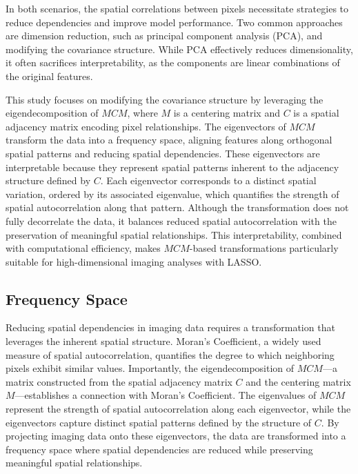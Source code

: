 \documentclass[12pt]{article}
\begin{document}
In both scenarios, the spatial correlations between pixels necessitate strategies to reduce dependencies and improve model performance. Two common approaches are dimension reduction, such as principal component analysis (PCA), and modifying the covariance structure. While PCA effectively reduces dimensionality, it often sacrifices interpretability, as the components are linear combinations of the original features.

This study focuses on modifying the covariance structure by leveraging the eigendecomposition of \( MCM \), where \( M \) is a centering matrix and \( C \) is a spatial adjacency matrix encoding pixel relationships. The eigenvectors of \( MCM \) transform the data into a frequency space, aligning features along orthogonal spatial patterns and reducing spatial dependencies. These eigenvectors are interpretable because they represent spatial patterns inherent to the adjacency structure defined by \( C \). Each eigenvector corresponds to a distinct spatial variation, ordered by its associated eigenvalue, which quantifies the strength of spatial autocorrelation along that pattern. Although the transformation does not fully decorrelate the data, it balances reduced spatial autocorrelation with the preservation of meaningful spatial relationships. This interpretability, combined with computational efficiency, makes \( MCM \)-based transformations particularly suitable for high-dimensional imaging analyses with LASSO.



\subsection{Frequency Space}

Reducing spatial dependencies in imaging data requires a transformation that leverages the inherent spatial structure. Moran's Coefficient, a widely used measure of spatial autocorrelation, quantifies the degree to which neighboring pixels exhibit similar values. Importantly, the eigendecomposition of \( MCM \)—a matrix constructed from the spatial adjacency matrix \( C \) and the centering matrix \( M \)—establishes a connection with Moran's Coefficient. The eigenvalues of \( MCM \) represent the strength of spatial autocorrelation along each eigenvector, while the eigenvectors capture distinct spatial patterns defined by the structure of \( C \). By projecting imaging data onto these eigenvectors, the data are transformed into a frequency space where spatial dependencies are reduced while preserving meaningful spatial relationships.
\end{document}
